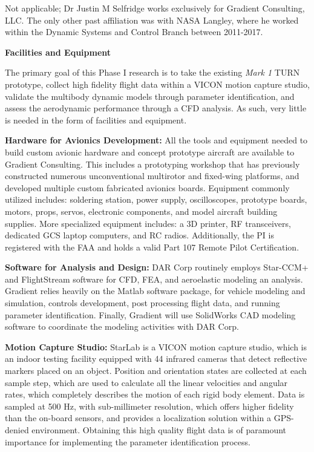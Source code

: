 \documentclass[11pt]{article}
\begin{document}
Not applicable; Dr Justin M Selfridge works exclusively for Gradient Consulting, LLC.  The only other past affiliation was with NASA Langley, where he worked within the Dynamic Systems and Control Branch between 2011-2017.








\newpage
{\bf \Huge Facilities and Equipment}

The primary goal of this Phase I research is to take the existing \emph{Mark 1} TURN prototype, collect high fidelity flight data within a VICON motion capture studio, validate the multibody dynamic models through parameter identification, and assess the aerodynamic performance through a CFD analysis.  As such, very little is needed in the form of facilities and equipment.


{\bf Hardware for Avionics Development:}
All the tools and equipment needed to build custom avionic hardware and concept prototype aircraft are available to Gradient Consulting.  This includes a prototyping workshop that has previously constructed numerous unconventional multirotor and fixed-wing platforms, and developed multiple custom fabricated avionics boards.  Equipment commonly utilized includes: soldering station, power supply, oscilloscopes, prototype boards, motors, props, servos, electronic components, and model aircraft building supplies.  More specialized equipment includes: a 3D printer, RF transceivers, dedicated GCS laptop computers, and RC radios.  Additionally, the PI is registered with the FAA and holds a valid Part 107 Remote Pilot Certification.


{\bf Software for Analysis and Design:}
DAR Corp routinely employs Star-CCM+ and FlightStream software for CFD, FEA, and aeroelastic modeling an analysis.  Gradient relies heavily on the Matlab software package, for vehicle modeling and simulation, controls development, post processing flight data, and running parameter identification.  Finally, Gradient will use SolidWorks CAD modeling software to coordinate the modeling activities with DAR Corp.


{\bf Motion Capture Studio:}
StarLab is a VICON motion capture studio, which is an indoor testing facility equipped with 44 infrared cameras that detect reflective markers placed on an object.  Position and orientation states are collected at each sample step, which are used to calculate all the linear velocities and angular rates, which completely describes the motion of each rigid body element.  Data is sampled at 500 Hz, with sub-millimeter resolution, which offers higher fidelity than the on-board sensors, and provides a localization solution within a GPS-denied environment.  Obtaining this high quality flight data is of paramount importance for implementing the parameter identification process.
\end{document}
